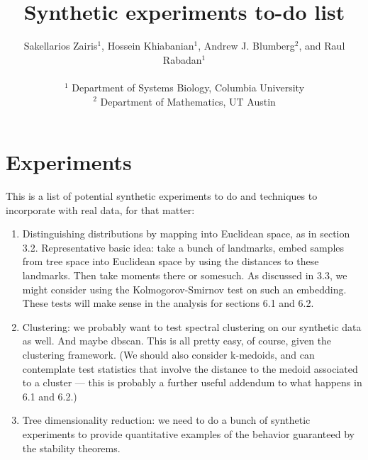 \documentclass[a4paper,11pt]{article}
\begin{document}
\title{Synthetic experiments to-do list}

\author{Sakellarios Zairis$^1$, Hossein Khiabanian$^1$, Andrew J. Blumberg$^2$, and Raul Rabadan$^1$\\
\\
$^1$ Department of Systems Biology, Columbia University\\
$^2$ Department of Mathematics, UT Austin\\}
\maketitle

\section{Experiments}

This is a list of potential synthetic experiments to do and techniques
to incorporate with real data, for that matter:

\begin{enumerate}

\item Distinguishing distributions by mapping into Euclidean space, as
  in section 3.2.  Representative basic idea: take a bunch of
  landmarks, embed samples from tree space into Euclidean space by
  using the distances to these landmarks.  Then take moments there or
  somesuch.  As discussed in 3.3, we might consider using the
  Kolmogorov-Smirnov test on such an embedding.  These tests will 
  make sense in the analysis for sections 6.1 and 6.2.

\item Clustering: we probably want to test spectral clustering on our
  synthetic data as well.  And maybe dbscan.  This is all pretty easy,
  of course, given the clustering framework.  (We should also consider
  k-medoids, and can contemplate test statistics that involve the
  distance to the medoid associated to a cluster --- this is probably
  a further useful addendum to what happens in 6.1 and 6.2.)

\item Tree dimensionality reduction: we need to do a bunch of
  synthetic experiments to provide quantitative examples of the
  behavior guaranteed by the stability theorems.

\end{enumerate}
\end{document}
